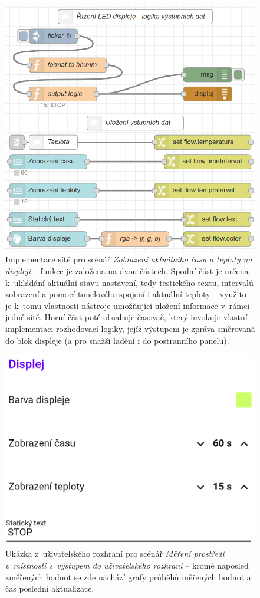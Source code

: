 \begin{figure}
    \centering
    \includegraphics[width=.7\textwidth]{figures/fis-flow-2.png}
    \caption{Implementace sítě pro scénář \textit{Zobrazení aktuálního času a teploty na displeji} -- funkce je
    založena na dvou částech.
    Spodní část je určena k~ukládání aktuální stavu nastavení, tedy testického textu, intervalů zobrazení a pomocí
    tunelového spojení i aktuální teploty -- využito je k~tomu vlastnosti nástroje umožňující uložení informace
v~rámci jedné sítě.
    Horní část poté obsahuje časovač, který invokuje vlastní implementaci rozhodovací logiky, jejíž výstupem je
    zpráva směrovaná do blok displeje (a pro snažší ladění i do postranního panelu).}
    \label{fig:node-red-production-2}
\end{figure}
\begin{figure}
    \centering
    \includegraphics[width=.5\textwidth]{figures/fis-flow-2-ui.png}
    \caption{Ukázka z~uživatelského rozhraní pro scénář \textit{Měření prostředí v~místnosti s~výstupem do
    uživatelského rozhraní} -- kromě naposled změřených hodnot se zde nachází grafy průběhů měřených hodnot a čas
    poslední aktualizace.}
    \label{fig:node-red-production-2-ui}
\end{figure}


